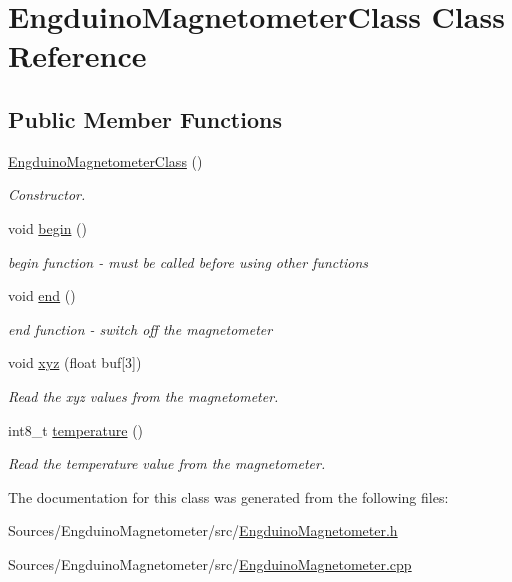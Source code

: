 \hypertarget{class_engduino_magnetometer_class}{}\section{Engduino\+Magnetometer\+Class Class Reference}
\label{class_engduino_magnetometer_class}
\subsection*{Public Member Functions}
\begin{DoxyCompactItemize}
\item 
\hyperlink{group___engduino_magnetometer_gae1071725c5dd446f23764ef3baf41ff8}{Engduino\+Magnetometer\+Class} ()
\begin{DoxyCompactList}\small\item\em Constructor. \end{DoxyCompactList}\item 
void \hyperlink{group___engduino_magnetometer_gac9cf25d9dd4ea77000eb389b4ddc9614}{begin} ()
\begin{DoxyCompactList}\small\item\em begin function -\/ must be called before using other functions \end{DoxyCompactList}\item 
void \hyperlink{group___engduino_magnetometer_gabcb49e5bf9097ea614aae4383a38e345}{end} ()
\begin{DoxyCompactList}\small\item\em end function -\/ switch off the magnetometer \end{DoxyCompactList}\item 
void \hyperlink{group___engduino_magnetometer_gaaaa9c673b8daec5cf36c12ee695cb2f8}{xyz} (float buf\mbox{[}3\mbox{]})
\begin{DoxyCompactList}\small\item\em Read the xyz values from the magnetometer. \end{DoxyCompactList}\item 
int8\+\_\+t \hyperlink{group___engduino_magnetometer_gaef57b103d9bae9612d14c42136a1753f}{temperature} ()
\begin{DoxyCompactList}\small\item\em Read the temperature value from the magnetometer. \end{DoxyCompactList}\end{DoxyCompactItemize}


The documentation for this class was generated from the following files\+:\begin{DoxyCompactItemize}
\item 
Sources/\+Engduino\+Magnetometer/src/\hyperlink{_engduino_magnetometer_8h}{Engduino\+Magnetometer.\+h}\item 
Sources/\+Engduino\+Magnetometer/src/\hyperlink{_engduino_magnetometer_8cpp}{Engduino\+Magnetometer.\+cpp}\end{DoxyCompactItemize}

